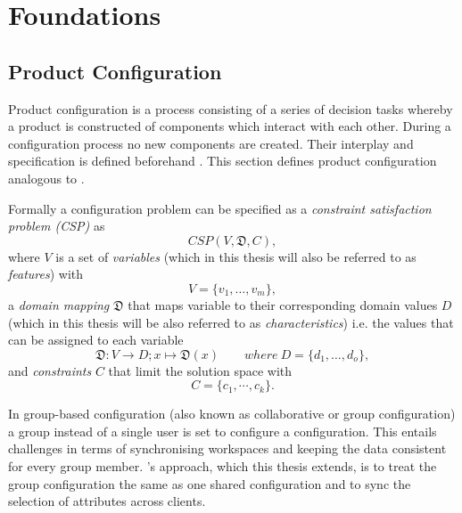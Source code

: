 \chapter{Foundations}
\label{ch:Foundations}

\section{Product Configuration}
\label{sec:Foundations:ProductConfiguration}

Product configuration is a process consisting of a series of decision tasks whereby a product is constructed of components which interact with each other. During a configuration process no new components are created. Their interplay and specification is defined beforehand \cite[~ pp. 42, 43]{sabinProductConfigurationFrameworksa1998}. This section defines product configuration analogous to \citeauthor{felfernigOpenConfiguration2014} \cite{felfernigOpenConfiguration2014}.

Formally a configuration problem can be specified as a \emph{constraint satisfaction problem (CSP)} \cite{tsangFoundationsConstraintSatisfaction1993} as 
\begin{equation} \label{eq:Foundations:ProductConfiguration:ConstraintSatisfactionProblem}
    CSP(V,\mathfrak{D},C),
\end{equation}
where $V$ is a set of \emph{variables} (which in this thesis will also be referred to as \emph{features}) with
\begin{equation} \label{eq:Foundations:ProductConfiguration:Variables}
    V = \{v_1, \dotsc, v_m\},
\end{equation}
a \emph{domain mapping} $\mathfrak{D}$ that maps variable to their corresponding domain values $D$ (which in this thesis will be also referred to as \emph{characteristics}) i.e. the values that can be assigned to each variable
\begin{equation}\label{eq:Foundations:ProductConfiguration:DomainMapping}
    \mathfrak{D} : V \to D; x \mapsto \mathfrak{D}(x) \qquad where \ D = \{d_1, \dotsc, d_o\},
\end{equation}
and \emph{constraints} $C$ that limit the solution space with 
\begin{equation}\label{eq:Foundations:ProductConfiguration:Constraints}
    C = \{c_1, \cdots, c_k\}.
\end{equation}

In group-based configuration (also known as collaborative or group configuration) a group instead of a single user is set to configure a configuration. This entails challenges in terms of synchronising  workspaces and keeping the data consistent for every group member. \citeauthor{raabKollaborativeProduktkonfigurationEchtzeit2019}'s \cite{raabKollaborativeProduktkonfigurationEchtzeit2019} approach, which this thesis extends, is to treat the group configuration the same as one shared configuration and to sync the selection of attributes across clients.


